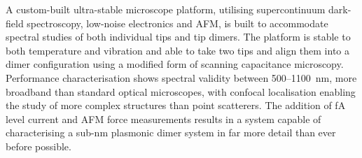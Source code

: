 \documentclass[12pt, a4paper, oneside]{book}
\begin{document}
A custom-built ultra-stable microscope platform, utilising supercontinuum dark-field spectroscopy, low-noise electronics and AFM, is built to accommodate spectral studies of both individual tips and tip dimers. The platform is stable to both temperature and vibration and able to take two tips and align them into a dimer configuration using a modified form of scanning capacitance microscopy. Performance characterisation shows spectral validity between 500--\SI{1100}{nm}, more broadband than standard optical microscopes, with confocal localisation enabling the study of more complex structures than point scatterers. The addition of \si{fA} level current and AFM force measurements results in a system capable of characterising a sub-nm plasmonic dimer system in far more detail than ever before possible.

\ifstandalone
\begin{singlespace}
\printbibliography[notcategory=fullcited]
\end{singlespace}
\fi
\end{document}
